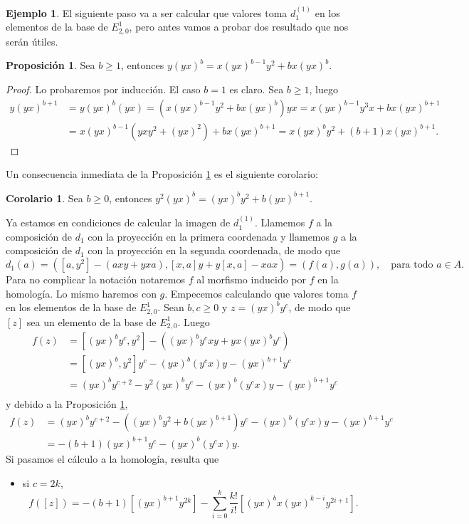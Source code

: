 \documentclass[a4paper,oneside,fleqn,11pt]{report}
\theoremstyle{definition}
\theoremstyle{definition}
\newtheorem{example}{Ejemplo}[section]
\newtheorem{prop}{Proposición}
\newtheorem{coro}{Corolario}
\numberwithin{prop}{subsection}
\begin{document}
\begin{example}
El siguiente paso va a ser calcular que valores toma $d_1^{(1)}$ en los elementos de la base de $E^1_{2, 0}$, pero antes
vamos a probar dos resultado que nos serán útiles.
\begin{prop}
\label{conmutary}
Sea $b \geq 1$, entonces $y(yx)^b = x(yx)^{b - 1}y^2 + bx(yx)^b$.
\end{prop}
\begin{proof}
Lo probaremos por inducción. El caso $b = 1$ es claro. Sea $b \geq 1$, luego
\begin{align*}
	y(yx)^{b + 1} &= y(yx)^b(yx) = (x(yx)^{b - 1}y^2 + bx(yx)^b)yx = x(yx)^{b - 1}y^3x + bx(yx)^{b + 1}\\
	&= x(yx)^{b - 1}(yxy^2 + (yx)^2) + bx(yx)^{b + 1} = x(yx)^{b}y^2 + (b + 1)x(yx)^{b + 1}.
\end{align*}
\end{proof}
Un consecuencia inmediata de la Proposición \ref{conmutary} es el siguiente corolario:
\begin{coro}
\label{conmutary^2}
Sea $b \geq 0$, entonces $y^2(yx)^b = (yx)^{b}y^2 + b(yx)^{b + 1}$.
\end{coro}

Ya estamos en condiciones de calcular la imagen de $d_1^{(1)}$. Llamemos
$f$ a la composición de $d_1$ con la proyección en la primera coordenada y llamemos $g$ a la composición de $d_1$ con la proyección en la segunda coordenada, de modo que
\[
	d_1(a) =  \left(\left[a,y^2\right] - (axy + yxa), \left[x,a\right]y + y\left[x,a\right] - xax\right) = (f(a), g(a)), \quad\text{para todo } a \in A.
\]
Para no complicar la notación notaremos $f$ al morfismo inducido por $f$ en la homología. Lo mismo haremos con $g$.
Empecemos calculando que valores toma $f$ en los elementos de la base de $E^1_{2, 0}$. Sean $b, c \geq 0$ y $z = (yx)^by^c$, de modo que $\left[z\right]$
sea un elemento de la base de $E^1_{2, 0}$. Luego
\begin{align*}
	f(z) &= \left[(yx)^by^c, y^2\right] - \left((yx)^by^cxy + yx(yx)^by^c\right)\\
	&= \left[(yx)^b, y^2\right]y^c - (yx)^b(y^cx)y - (yx)^{b + 1}y^c \\
	&= (yx)^by^{c + 2} - y^2(yx)^by^c - (yx)^b(y^cx)y - (yx)^{b + 1}y^c \\
\end{align*}
y debido a la Proposición \ref{conmutary^2},
\begin{align*}
	f(z) &= (yx)^by^{c + 2} - ((yx)^by^2 + b(yx)^{b + 1})y^c - (yx)^b(y^cx)y - (yx)^{b + 1}y^c \\
	&= - (b + 1)(yx)^{b + 1}y^c - (yx)^b(y^cx)y.
\end{align*}
Si pasamos el cálculo a la homología, resulta que
\begin{itemize}
	\item si $c = 2k$,
	\[
		f([z]) = -(b + 1)\left[(yx)^{b + 1}y^{2k}\right] - \sum_{i  = 0}^k\frac{k!}{i!}\left[(yx)^bx(yx)^{k - i}y^{2i + 1}\right].
	\]	
	

\end{itemize}
\end{example}
\end{document}
